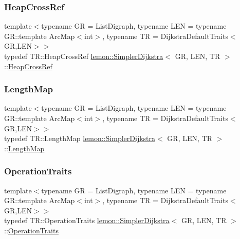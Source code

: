 \subsubsection{\texorpdfstring{Heap\+Cross\+Ref}{HeapCrossRef}}
{\footnotesize\ttfamily template$<$typename GR = List\+Digraph, typename L\+EN = typename G\+R\+::template Arc\+Map$<$int$>$, typename TR = Dijkstra\+Default\+Traits$<$\+G\+R,\+L\+E\+N$>$$>$ \\
typedef T\+R\+::\+Heap\+Cross\+Ref \hyperlink{classlemon_1_1_simpler_dijkstra}{lemon\+::\+Simpler\+Dijkstra}$<$ GR, L\+EN, TR $>$\+::\hyperlink{classlemon_1_1_simpler_dijkstra_ae4c36812930d6292b4154e26b76ea10f}{Heap\+Cross\+Ref}}

\mbox{\label{classlemon_1_1_simpler_dijkstra_adfe5498ef0a7699daf396dd6c4b7dfb6}} 
\subsubsection{\texorpdfstring{Length\+Map}{LengthMap}}
{\footnotesize\ttfamily template$<$typename GR = List\+Digraph, typename L\+EN = typename G\+R\+::template Arc\+Map$<$int$>$, typename TR = Dijkstra\+Default\+Traits$<$\+G\+R,\+L\+E\+N$>$$>$ \\
typedef T\+R\+::\+Length\+Map \hyperlink{classlemon_1_1_simpler_dijkstra}{lemon\+::\+Simpler\+Dijkstra}$<$ GR, L\+EN, TR $>$\+::\hyperlink{classlemon_1_1_simpler_dijkstra_adfe5498ef0a7699daf396dd6c4b7dfb6}{Length\+Map}}

\mbox{\label{classlemon_1_1_simpler_dijkstra_a324250f3aac580ddcc57cb2a84d5e9cd}} 
\subsubsection{\texorpdfstring{Operation\+Traits}{OperationTraits}}
{\footnotesize\ttfamily template$<$typename GR = List\+Digraph, typename L\+EN = typename G\+R\+::template Arc\+Map$<$int$>$, typename TR = Dijkstra\+Default\+Traits$<$\+G\+R,\+L\+E\+N$>$$>$ \\
typedef T\+R\+::\+Operation\+Traits \hyperlink{classlemon_1_1_simpler_dijkstra}{lemon\+::\+Simpler\+Dijkstra}$<$ GR, L\+EN, TR $>$\+::\hyperlink{classlemon_1_1_simpler_dijkstra_a324250f3aac580ddcc57cb2a84d5e9cd}{Operation\+Traits}}

